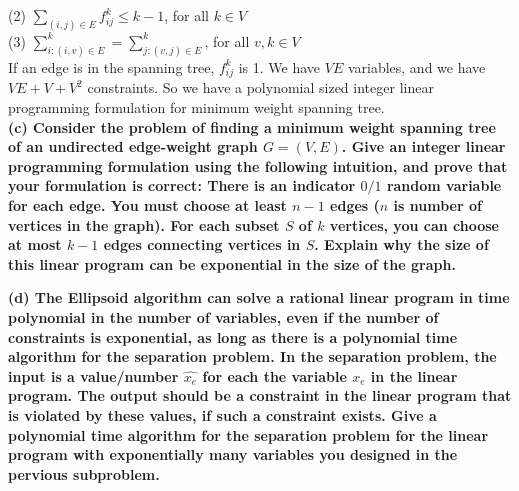\documentclass{article}
\begin{document}
(2) $\sum_{(i,j)\in E}f_{ij}^{k} \leq k - 1$, for all $k\in V$\\ \newline
(3) $\sum_{i: (i,v)\in E}^{k} = \sum_{j:(v, j)\in E}^{k}$, for all $v, k\in V$ \\ \newline
If an edge is in the spanning tree, $f_{ij}^{k}$ is 1. We have $VE$ variables, and we have $VE + V + V^2$ constraints. So we have a polynomial sized integer linear programming formulation for minimum weight spanning tree.\\ \newline
\textbf{(c) Consider the problem of finding a minimum weight spanning tree of an undirected edge-weight graph $G = (V, E)$. Give an integer linear programming formulation using the following intuition, and prove that your formulation is correct: There is an indicator $0/1$ random variable for each edge. You must choose at least $n - 1$ edges ($n$ is number of vertices in the graph). For each subset $S$ of $k$ vertices, you can choose at most $k - 1$ edges connecting vertices in $S$. Explain why the size of this linear program can be exponential in the size of the graph.} \\\newline


\textbf{(d) The Ellipsoid algorithm can solve a rational linear program in time polynomial in the number of variables, even if the number of constraints is exponential, as long as there is a polynomial time algorithm for the separation problem. In the separation problem, the input is a value/number $\hat{x_e}$ for each the variable $x_e$ in the linear program. The output should be a constraint in the linear program that is violated by these values, if such a constraint exists. Give a polynomial time algorithm for the separation problem for the linear program with exponentially many variables you designed in the pervious subproblem.}
\end{document}

